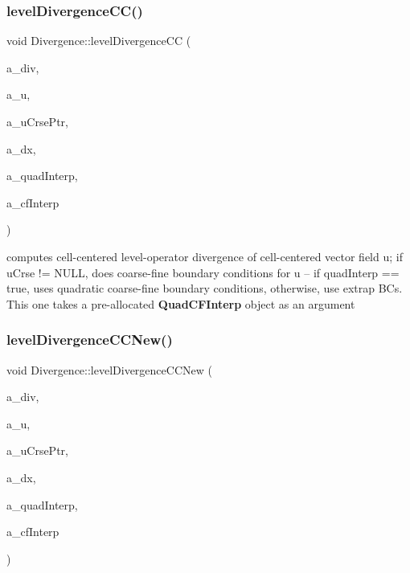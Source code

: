\subsubsection{\texorpdfstring{level\+Divergence\+C\+C()}{levelDivergenceCC()}\hspace{0.1cm}{\footnotesize\ttfamily [3/3]}}
{\footnotesize\ttfamily void Divergence\+::level\+Divergence\+CC (\begin{DoxyParamCaption}\item[{\textbf{ Level\+Data}$<$ \textbf{ F\+Array\+Box} $>$ \&}]{a\+\_\+div,  }\item[{\textbf{ Level\+Data}$<$ \textbf{ F\+Array\+Box} $>$ \&}]{a\+\_\+u,  }\item[{\textbf{ Level\+Data}$<$ \textbf{ F\+Array\+Box} $>$ $\ast$}]{a\+\_\+u\+Crse\+Ptr,  }\item[{const \textbf{ Real}}]{a\+\_\+dx,  }\item[{const bool}]{a\+\_\+quad\+Interp,  }\item[{\textbf{ Quad\+C\+F\+Interp} \&}]{a\+\_\+cf\+Interp }\end{DoxyParamCaption})\hspace{0.3cm}{\ttfamily [static]}}

computes cell-\/centered level-\/operator divergence of cell-\/centered vector field u; if u\+Crse != N\+U\+LL, does coarse-\/fine boundary conditions for u -- if quad\+Interp == true, uses quadratic coarse-\/fine boundary conditions, otherwise, use extrap BC\textquotesingle{}s. This one takes a pre-\/allocated \textbf{ Quad\+C\+F\+Interp} object as an argument \mbox{\label{class_divergence_a77ec6a5b421cc2360223b7b0879786e8}} 
\subsubsection{\texorpdfstring{level\+Divergence\+C\+C\+New()}{levelDivergenceCCNew()}}
{\footnotesize\ttfamily void Divergence\+::level\+Divergence\+C\+C\+New (\begin{DoxyParamCaption}\item[{\textbf{ Level\+Data}$<$ \textbf{ F\+Array\+Box} $>$ \&}]{a\+\_\+div,  }\item[{\textbf{ Level\+Data}$<$ \textbf{ F\+Array\+Box} $>$ \&}]{a\+\_\+u,  }\item[{\textbf{ Level\+Data}$<$ \textbf{ F\+Array\+Box} $>$ $\ast$}]{a\+\_\+u\+Crse\+Ptr,  }\item[{const \textbf{ Real}}]{a\+\_\+dx,  }\item[{const bool}]{a\+\_\+quad\+Interp,  }\item[{\textbf{ Quad\+C\+F\+Interp} \&}]{a\+\_\+cf\+Interp }\end{DoxyParamCaption})\hspace{0.3cm}{\ttfamily [static]}}

